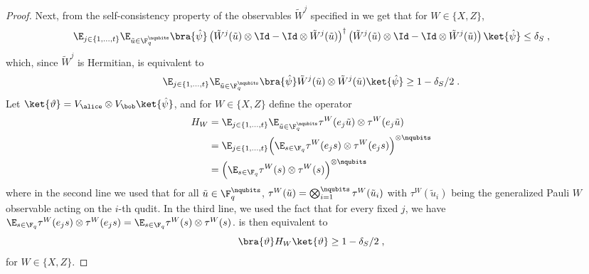 \begin{proof}
Next, from the self-consistency property of the observables $\tilde{W}^j$ specified in  we get that for $W \in \{X,Z\}$,
\[
	\E_{j \in \{1,\ldots,t\}} \E_{\tilde{u} \in \F_q^\nqubits} \bra{\hat{\psi}} \left ( \tilde{W}^j(\tilde{u}) \otimes \Id - \Id \otimes \tilde{W}^j(\tilde{u}) \right)^\dagger \left ( \tilde{W}^j(\tilde{u}) \otimes \Id - \Id \otimes \tilde{W}^j(\tilde{u}) \right) \ket{\hat{\psi}} \leq \delta_S\;,
\]
which, since $\tilde{W}^j$ is Hermitian, is equivalent to
\begin{equation}
\label{eq:qld-unitary-1}
\E_{j \in \{1,\ldots,t\}} \E_{\tilde{u} \in \F_q^\nqubits} \bra{\hat{\psi}} \tilde{W}^j(\tilde{u}) \otimes \tilde{W}^j(\tilde{u}) \ket{\hat{\psi}} \geq 1 - \delta_S/2\;.
\end{equation}
Let $\ket{\vartheta} = V_\alice \otimes V_\bob \ket{\hat{\psi}}$, and for $W \in \{X,Z\}$ define the operator
\begin{align*}
	H_W &= \E_{j \in \{1,\ldots,t\}} \E_{\tilde{u} \in \F_q^\nqubits} \tau^W(e_j \tilde{u}) \otimes \tau^W(e_j \tilde{u}) \\
		&= \E_{j \in \{1,\ldots,t\}} \Big ( \E_{s \in \F_q} \tau^W(e_j s) \otimes \tau^W(e_j s) \Big)^{\otimes \nqubits} \\
		&= \Big ( \E_{s \in \F_q} \tau^W(s) \otimes \tau^W(s) \Big)^{\otimes \nqubits}
\end{align*}
where in the second line we used that for all $\tilde{u} \in \F_q^\nqubits$, $\tau^W(\tilde{u}) = \bigotimes_{i = 1}^\nqubits \tau^W(\tilde{u}_i)$ with $\tau^W(\tilde{u}_i)$ being the generalized Pauli $W$ observable acting on the $i$-th qudit. In the third line, we used the fact that for every fixed $j$, we have $\E_{s \in \F_q} \tau^W(e_j s) \otimes \tau^W(e_j s) = \E_{s \in \F_q} \tau^W(s) \otimes \tau^W(s)$.  is then equivalent to 
\[
	\bra{\vartheta} H_W \ket{\vartheta} \geq 1 - \delta_S/2\;,
\]
for $W \in \{X,Z\}$. 


\end{proof}
